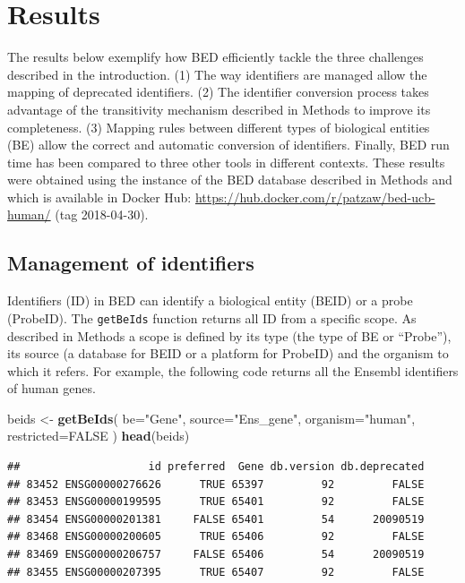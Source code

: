 \documentclass[9pt,a4paper,]{extarticle}
\newenvironment{Shaded}{\begin{snugshade}}{\end{snugshade}}
\newcommand{\KeywordTok}[1]{\textcolor[rgb]{0.13,0.29,0.53}{\textbf{#1}}}
\newcommand{\DataTypeTok}[1]{\textcolor[rgb]{0.13,0.29,0.53}{#1}}
\newcommand{\StringTok}[1]{\textcolor[rgb]{0.31,0.60,0.02}{#1}}
\newcommand{\OtherTok}[1]{\textcolor[rgb]{0.56,0.35,0.01}{#1}}
\newcommand{\NormalTok}[1]{#1}
\theoremstyle{definition}
\theoremstyle{definition}
\theoremstyle{definition}
\theoremstyle{remark}
\begin{document}
\section{Results}\label{results}

The results below exemplify how BED efficiently tackle the three challenges
described in the introduction. (1) The way identifiers are managed allow the
mapping of deprecated identifiers. (2) The identifier conversion process takes
advantage of the transitivity mechanism described in Methods to improve
its completeness. (3) Mapping rules between different types of
biological entities (BE) allow the correct and automatic conversion of
identifiers. Finally, BED run time has been compared to three other tools
in different contexts.
These results were obtained using the instance
of the BED database described in Methods and which is available
in Docker Hub: \url{https://hub.docker.com/r/patzaw/bed-ucb-human/}
(tag 2018-04-30).

\subsection{Management of identifiers}\label{management-of-identifiers}

Identifiers (ID) in BED can identify a biological entity (BEID)
or a probe (ProbeID).
The \texttt{getBeIds} function returns all ID from a specific scope.
As described in Methods a scope is defined
by its type (the type of BE or ``Probe''),
its source (a database for BEID or a platform for ProbeID)
and the organism to which it refers.
For example, the following code
returns all the Ensembl identifiers of human genes.

\begin{Shaded}
\begin{Highlighting}[]
\NormalTok{beids <-}\StringTok{ }\KeywordTok{getBeIds}\NormalTok{(}
    \DataTypeTok{be=}\StringTok{"Gene"}\NormalTok{, }\DataTypeTok{source=}\StringTok{"Ens_gene"}\NormalTok{, }\DataTypeTok{organism=}\StringTok{"human"}\NormalTok{,}
    \DataTypeTok{restricted=}\OtherTok{FALSE}
\NormalTok{)}
\KeywordTok{head}\NormalTok{(beids)}
\end{Highlighting}
\end{Shaded}

\begin{verbatim}
##                    id preferred  Gene db.version db.deprecated
## 83452 ENSG00000276626      TRUE 65397         92         FALSE
## 83453 ENSG00000199595      TRUE 65401         92         FALSE
## 83454 ENSG00000201381     FALSE 65401         54      20090519
## 83468 ENSG00000200605      TRUE 65406         92         FALSE
## 83469 ENSG00000206757     FALSE 65406         54      20090519
## 83455 ENSG00000207395      TRUE 65407         92         FALSE
\end{verbatim}
\end{document}
